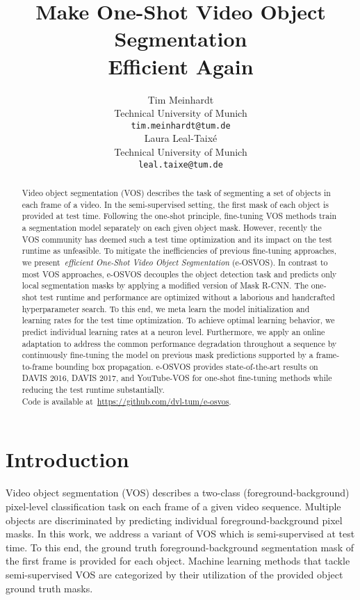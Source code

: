 \documentclass{article}
\title{Make One-Shot Video Object Segmentation \\ Efficient Again}
\author{Tim Meinhardt \\
  Technical University of Munich \\
  \texttt{tim.meinhardt@tum.de} \\
  \And
  Laura Leal-Taix{\'e} \\
  Technical University of Munich \\
  \texttt{leal.taixe@tum.de} \\
}
\begin{document}
\maketitle





\begin{abstract}

    Video object segmentation (VOS) describes the task of segmenting a set of objects in each frame of a video.
In the semi-supervised setting, the first mask of each object is provided at test time.
Following the one-shot principle, fine-tuning VOS methods train a segmentation model separately on each given object mask.
However, recently the VOS community has deemed such a test time optimization and its impact on the test runtime as unfeasible.
To mitigate the inefficiencies of previous fine-tuning approaches, we present~\textit{efficient One-Shot Video Object Segmentation} (e-OSVOS).
In contrast to most VOS approaches, e-OSVOS decouples the object detection task and predicts only local segmentation masks by applying a modified version of Mask R-CNN.
The one-shot test runtime and performance are optimized without a laborious and handcrafted hyperparameter search.
To this end, we meta learn the model initialization and learning rates for the test time optimization.
To achieve optimal learning behavior, we predict individual learning rates at a neuron level. Furthermore, we apply an online adaptation to address the common performance degradation throughout a sequence by continuously fine-tuning the model on previous mask predictions supported by a frame-to-frame bounding box propagation. e-OSVOS provides state-of-the-art results on DAVIS 2016, DAVIS 2017, and YouTube-VOS for one-shot fine-tuning methods while reducing the test runtime substantially.
\\
Code is available at~\url{https://github.com/dvl-tum/e-osvos}.

\end{abstract} 

\section{Introduction}

    Video object segmentation (VOS) describes a two-class (foreground-background) pixel-level classification task on each frame of a given video sequence.
Multiple objects are discriminated by predicting individual foreground-background pixel masks.
In this work, we address a variant of VOS which is semi-supervised at test time.
To this end, the ground truth foreground-background segmentation mask of the first frame is provided for each object. Machine learning methods that tackle semi-supervised VOS are categorized by their utilization of the provided object ground truth masks.
\end{document}
